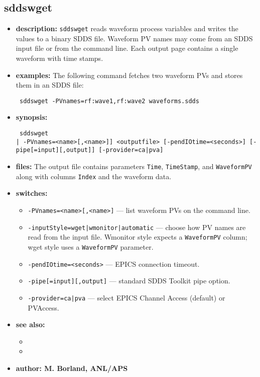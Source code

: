 \begin{latexonly}
\newpage
\end{latexonly}

\subsection{sddswget}
\label{sddswget}

\begin{itemize}
\item {\bf description:}
  \verb+sddswget+ reads waveform process variables and writes the values to a binary SDDS file.  Waveform PV names may come from an SDDS input file or from the command line.  Each output page contains a single waveform with time stamps.

\item {\bf examples:}
  The following command fetches two waveform PVs and stores them in an SDDS file:
  \begin{flushleft}{\tt
  sddswget -PVnames=rf:wave1,rf:wave2 waveforms.sdds
  }\end{flushleft}

\item {\bf synopsis:}
  \begin{flushleft}{\tt
  sddswget\\\relax
      [<inputfile> [-inputStyle={wget|wmonitor|automatic}] | -PVnames=<name>[,<name>]]\
      <outputfile> [-pendIOtime=<seconds>] [-pipe[=input][,output]]\
      [-provider={ca|pva}]\
  }\end{flushleft}

\item {\bf files:}
  The output file contains parameters \verb+Time+, \verb+TimeStamp+, and \verb+WaveformPV+ along with columns \verb+Index+ and the waveform data.

\item {\bf switches:}
  \begin{itemize}
    \item {\tt -PVnames=<name>[,<name>]} --- list waveform PVs on the command line.
    \item {\tt -inputStyle={wget|wmonitor|automatic}} --- choose how PV names are read from the input file.  Wmonitor style expects a \verb+WaveformPV+ column; wget style uses a \verb+WaveformPV+ parameter.
    \item {\tt -pendIOtime=<seconds>} --- EPICS connection timeout.
    \item {\tt -pipe[=input][,output]} --- standard SDDS Toolkit pipe option.
    \item {\tt -provider={ca|pva}} --- select EPICS Channel Access (default) or PVAccess.
  \end{itemize}

\item {\bf see also:}
  \begin{itemize}
    \item {}
    \item {}
  \end{itemize}

\item {\bf author: M. Borland, ANL/APS}
\end{itemize}
